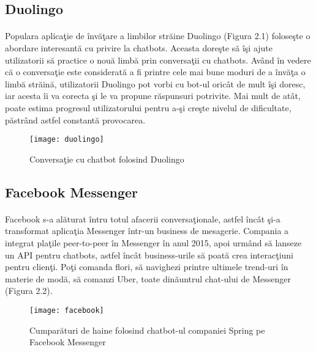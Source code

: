 \subsection{Duolingo}

\paragraph{}
Populara aplica\c tie de \^ inv\u a\c tare a limbilor str\u aine Duolingo (Figura 2.1) folose\c ste o abordare interesant\u a cu privire la chatbots. Aceasta dore\c ste s\u a \^ i\c si ajute utilizatorii s\u a practice o nou\u a limb\u a prin conversa\c tii cu chatbots. Av\^ and \^ in vedere c\u a o conversa\c tie este considerat\u a a fi printre cele mai bune moduri de a \^ inv\u a\c ta o limb\u a str\u ain\u a, utilizatorii Duolingo pot vorbi cu bot-ul oric\^ at de mult \^ i\c si doresc, iar acesta \^ ii va corecta \c si le va propune r\u aspunsuri potrivite. Mai mult de at\^ at, poate estima progresul utilizatorului pentru a-\c si cre\c ste nivelul de dificultate, p\u astr\^ and astfel constant\u a provocarea.

\begin{figure}[H]
\centering
\texttt{[image: duolingo]}
\caption{Conversa\c tie cu chatbot folosind Duolingo}
\end{figure}

\subsection{Facebook Messenger}

\paragraph{}
Facebook s-a al\u aturat \^ intru totul afacerii conversa\c tionale, astfel \^ inc\^ at \c si-a transformat aplica\c tia Messenger \^ intr-un business de mesagerie. Compania a integrat pla\c tile peer-to-peer \^ in Messenger \^ in anul 2015, apoi urm\^ and s\u a lanseze un API pentru chatbots, astfel \^ inc\^ at business-urile s\u a poat\u a crea interac\c tiuni pentru clien\c ti. Po\c ti comanda flori, s\u a navighezi printre ultimele trend-uri \^ in materie de mod\u a, s\u a comanzi Uber, toate din\u auntrul chat-ului de Messenger (Figura 2.2).

\begin{figure}[H]
\centering
\texttt{[image: facebook]}
\caption{Cumpar\u aturi de haine folosind chatbot-ul companiei Spring pe Facebook Messenger}
\end{figure}


